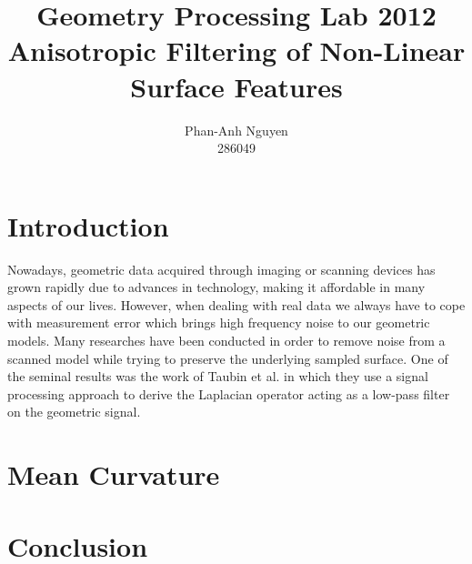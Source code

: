 \documentclass[11pt]{article}
\author{Phan-Anh Nguyen\\
		286049}
\title{Geometry Processing Lab 2012\\
	   Anisotropic Filtering of Non-Linear Surface Features}
\begin{document}
\maketitle



\section{Introduction}

Nowadays, geometric data acquired through imaging or scanning devices has grown rapidly due to advances in technology, making it affordable in many aspects of our lives. However, when dealing with real data we always have to cope with measurement error which brings high frequency noise to our geometric models. Many researches have been conducted in order to remove noise from a scanned model while trying to preserve the underlying sampled surface. One of the seminal results was the work of Taubin et al. \cite{Taubin:1995:SPA:218380.218473} in which they use a signal processing approach to derive the Laplacian operator acting as a low-pass filter on the geometric signal. \cite{Hildebrandt04anisotropicfiltering}

\section{Mean Curvature}



\section{Conclusion}





\end{document}
